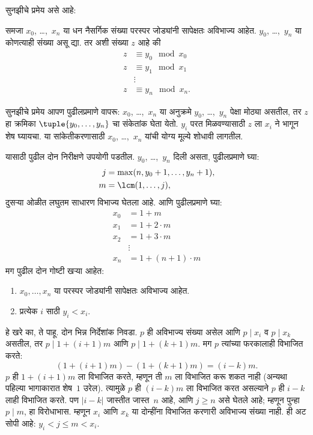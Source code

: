 \documentclass[../../../include/open-logic-section]{subfiles}
\begin{document}
सुनझीचे प्रमेय असे आहे:
\begin{thm}
समजा $x_0$, \dots,~$x_n$ या धन नैसर्गिक संख्या परस्पर जोड्यांनी सापेक्षतः
अविभाज्य आहेत. $y_0$, \dots,~$y_n$ या कोणत्याही संख्या असू द्या.
तर अशी संख्या $z$ आहे की
\begin{align*}
z & \equiv y_0 \mod x_0 \\
z & \equiv y_1 \mod x_1 \\
& \vdots  \\
z & \equiv y_n \mod x_n.
\end{align*}
\end{thm}

सुनझीचे प्रमेय आपण पुढीलप्रमाणे वापरू: $x_0$, \dots,~$x_n$
या अनुक्रमे $y_0$, \dots,~$y_n$ पेक्षा मोठ्या असतील, तर
$z$ हा क्रमिका $\tuple{y_0, \dots,y_n}$ चा संकेतांक घेता येतो.
$y_i$ परत मिळवण्यासाठी $z$ ला $x_i$ ने भागून शेष घ्यायचा.
या सांकेतीकरणासाठी $x_0$, \dots,~$x_n$ यांची योग्य मूल्ये
शोधावी लागतील.

यासाठी पुढील दोन निरीक्षणे उपयोगी पडतील. $y_0$, \dots,~$y_n$
दिली असता, पुढीलप्रमाणे घ्या:
\begin{align*}
j &= \max(n, y_0 + 1, \dots, y_n + 1), \\
m &= \lcm(1,\dots,j),
\end{align*}
दुसऱ्या ओळीत लघुतम साधारण विभाज्य घेतला आहे.
आणि पुढीलप्रमाणे घ्या:
\begin{align*}
x_0 & = 1 + m \\
x_1 & = 1 + 2 \cdot m \\
x_2 & = 1 + 3 \cdot m \\
& \vdots  \\
x_n & = 1 + (n+1) \cdot m
\end{align*}
मग पुढील दोन गोष्टी खऱ्या आहेत:
\begin{enumerate}
\item{} $x_0,\dots,x_n$ या परस्पर जोड्यांनी
  सापेक्षतः अविभाज्य आहेत.
\item{} प्रत्येक $i$ साठी $y_i < x_i$.
\end{enumerate}
 हे खरे का, ते पाहू. दोन भिन्न निर्देशांक
निवडा. $p$ ही अविभाज्य संख्या
असेल आणि $p \mid x_i$ व $p \mid x_k$ असतील, तर
$p \mid 1 + (i+1) m$ आणि $p \mid 1 + (k+1) m$.
मग $p$ त्यांच्या फरकालाही विभाजित करते:
\[
(1 + (i+1)m) - (1+ (k+1)m) = (i-k) m.
\]
$p$ ही $1 + (i+1)m$ ला विभाजित करते, म्हणून ती $m$ ला
विभाजित करू शकत नाही (अन्यथा पहिल्या भागाकारात शेष~$1$
उरेल). त्यामुळे $p$ ही $(i-k)m$ ला विभाजित करत असल्याने
$p$ ही $i-k$ लाही विभाजित करते. पण $\left|i-k\right|$ जास्तीत
जास्त~$n$ आहे, आणि $j \geq n$ असे घेतले आहे; म्हणून
पुन्हा $p \mid m$, हा विरोधाभास. म्हणून $x_i$ आणि
$x_k$ या दोन्हींना विभाजित करणारी अविभाज्य संख्या नाही.
 ही अट सोपी आहे: $y_i < j \leq m < x_i$.
\end{document}
